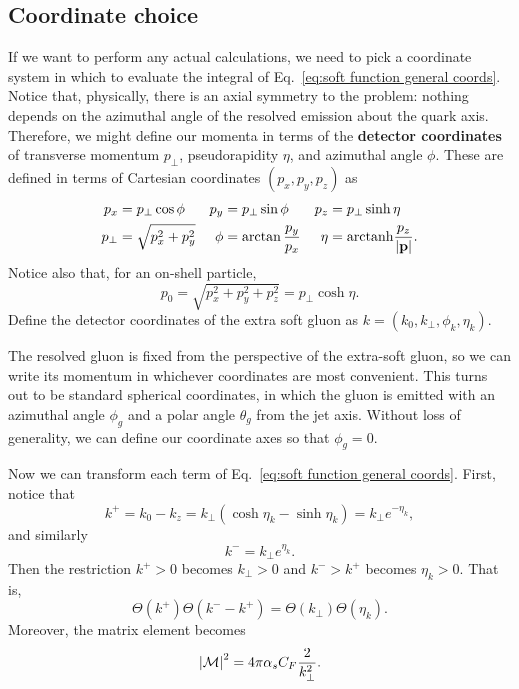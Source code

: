 \documentclass[12pt,twoside,class=../reedthesis, crop=false]{standalone}
\providecommand{\arctanh}{\mathrm{arctanh}}
\providecommand{\cM}{\mathcal{M}}
\begin{document}
\subsection{Coordinate choice}
	If we want to perform any actual calculations, we need to pick a coordinate system in which to evaluate the integral of Eq.~\ref{eq:soft function general coords}. Notice that, physically, there is an axial symmetry to the problem: nothing depends on the azimuthal angle of the resolved emission about the quark axis. Therefore, we might define our momenta in terms of the \textbf{detector coordinates} of transverse momentum $p_\perp$, pseudorapidity $\eta$, and azimuthal angle $\phi$. These are defined in terms of Cartesian coordinates $(p_x, p_y, p_z)$ as
	\begin{align}
		p_x &= p_\perp \cos\phi & p_y &= p_\perp \sin\phi & p_z &= p_\perp \sinh\eta \\
		p_\perp &= \sqrt{p_x^2 + p_y^2} & \phi &= \arctan\frac{p_y}{p_x} & \eta &= \arctanh\frac{p_z}{\abs{\vb{p}}}.
	\end{align}
	Notice also that, for an on-shell particle,
	\begin{equation}
		p_0 = \sqrt{p_x^2 + p_y^2 + p_z^2} = p_\perp \cosh\eta.
	\end{equation}
	Define the detector coordinates of the extra soft gluon as $k = (k_0, k_\perp, \phi_k, \eta_k)$.

	The resolved gluon is fixed from the perspective of the extra-soft gluon, so we can write its momentum in whichever coordinates are most convenient. This turns out to be standard spherical coordinates, in which the gluon is emitted with an azimuthal angle $\phi_g$ and a polar angle $\theta_g$ from the jet axis. Without loss of generality, we can define our coordinate axes so that $\phi_g = 0$.

	Now we can transform each term of Eq.~\ref{eq:soft function general coords}. First, notice that
	\begin{equation}
		k^+ = k_0 - k_z = k_\perp (\cosh\eta_k - \sinh\eta_k) = k_\perp e^{-\eta_k},
	\end{equation}
	and similarly
	\begin{equation}
		k^- = k_\perp e^{\eta_k}.
	\end{equation}
	Then the restriction $k^+ > 0$ becomes $k_\perp > 0$ and $k^- > k^+$ becomes $\eta_k > 0$. That is,
	\begin{equation}\label{eq:phase space constraints specific coords}
		\Theta(k^+) \Theta(k^- - k^+) = \Theta(k_\perp)\Theta(\eta_k).
	\end{equation}
	Moreover, the matrix element becomes
	\begin{equation}\label{eq:matrix element specific coords}
		\abs{\cM}^2 = 4\pi\alpha_s C_F \frac{2}{k_\perp^2}.
	\end{equation}
\end{document}
